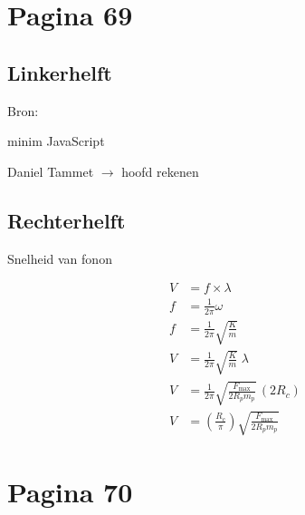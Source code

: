\documentclass[11pt,a4paper]{article}
\begin{document}
\clearpage
\section*{Pagina 69}

\begin{minipage}[t]{0.46\textwidth}
\subsection*{Linkerhelft}

Bron:

minim JavaScript

Daniel Tammet $\rightarrow$ hoofd rekenen
\end{minipage}
\hfill
\begin{minipage}[t]{0.50\textwidth}
\subsection*{Rechterhelft}

Snelheid van fonon

\begin{align*}
V &= f \times \lambda
\\
f &= \frac{1}{2\pi}\omega
\\
f &= \frac{1}{2\pi}\sqrt{\frac{K}{m}}
\\[0.5em]
V &= \frac{1}{2\pi}\sqrt{\frac{K}{m}}\;\lambda
\\
V &= \frac{1}{2\pi}\sqrt{\frac{F_{\max}}{2R_p m_p}}\,(2R_c)
\\
V &= \left(\frac{R_c}{\pi}\right)\sqrt{\frac{F_{\max}}{2R_p m_p}}
\end{align*}
\end{minipage}

\clearpage
\section*{Pagina 70}
\end{document}
